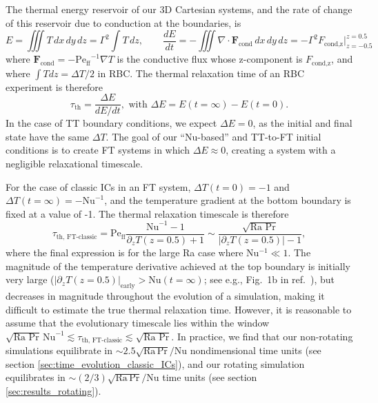 \documentclass[aps, pre, onecolumn, nofootinbib, notitlepage, groupedaddress, amsfonts, amssymb, amsmath, longbibliography, superscriptaddress]{revtex4-1}
\newcommand{\grad}{\ensuremath{\nabla}}
\newcommand{\Peff}{\ensuremath{\text{Pe}_{\text{ff}}}}
\begin{document}
The thermal energy reservoir of our 3D Cartesian systems, and the rate of change of this reservoir due to conduction at the boundaries, is
\begin{equation}
E = \iiint T\,dx\,dy\,dz = \Gamma^2 \int T\,dz,
\qquad
\frac{dE}{dt} = -\iiint \grad\cdot \bm{F}_{\text{cond}}\,dx\,dy\,dz = -\Gamma^2 F_{\text{cond,z}}\bigg|_{z=-0.5}^{z=0.5}
\end{equation}
where $\bm{F}_{\text{cond}} = -\Peff^{-1}\grad T$ is the conductive flux whose z-component is $F_{\text{cond,z}}$, and where $\int T dz = \Delta T / 2$ in RBC.
The thermal relaxation time of an RBC experiment is therefore
\begin{equation}
\tau_{\text{th}} = \frac{\Delta E}{dE/dt},
\,\,\text{with}\,\,
\Delta E = E(t=\infty) - E(t=0).
\end{equation}
In the case of TT boundary conditions, we expect $\Delta E = 0$, as the initial and final state have the same $\Delta T$.
The goal of our ``Nu-based'' and TT-to-FT initial conditions is to create FT systems in which $\Delta E \approx 0$, creating a system with a negligible relaxational timescale.

For the case of classic ICs in an FT system, $\Delta T(t=0) = -1$ and $\Delta T(t=\infty) = -\text{Nu}^{-1}$, and the temperature gradient at the bottom boundary is fixed at a value of -1.
The thermal relaxation timescale is therefore
\begin{equation}
\tau_{\text{th, FT-classic}} = \Peff \frac{\text{Nu}^{-1} - 1}{\partial_z T(z=0.5) + 1} \sim \frac{\sqrt{\text{Ra Pr}}}{|\partial_z T(z = 0.5)| - 1},
\end{equation}
where the final expression is for the large Ra case where Nu$^{-1} \ll 1$.
The magnitude of the temperature derivative achieved at the top boundary is initially very large ($|\partial_z T(z=0.5)|_{\text{early}} > \text{Nu}(t=\infty)$; see e.g., Fig.~1b in ref.~\cite{anders&all2018}), but decreases in magnitude throughout the evolution of a simulation, making it difficult to estimate the true thermal relaxation time.
However, it is reasonable to assume that the evolutionary timescale lies within the window $\sqrt{\text{Ra Pr}} \,\text{Nu}^{-1} \lesssim \tau_{\text{th, FT-classic}} \lesssim \sqrt{\text{Ra Pr}}$.
In practice, we find that our non-rotating simulations equilibrate in $\sim 2.5\sqrt{\text{Ra}\,\text{Pr}}/\text{Nu}$ nondimensional time units (see section \ref{sec:time_evolution_classic_ICs}), and our rotating simulation equilibrates in $\sim (2/3)\sqrt{\text{Ra}\,\text{Pr}}/\text{Nu}$ time units (see section \ref{sec:results_rotating}).
\end{document}

